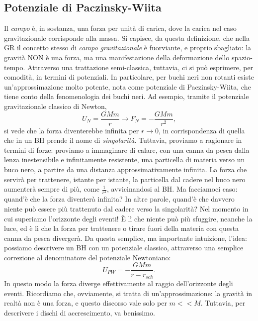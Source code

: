 \subsection{Potenziale di Paczinsky-Wiita}
Il \textit{campo} è, in sostanza, una forza per unità di carica, dove la carica nel caso gravitazionale corrisponde alla massa.
Si capisce, da questa definizione, che nella GR il concetto stesso di \textit{campo gravitazionale} è fuorviante, e proprio sbagliato: la gravità NON è una forza, ma una manifestazione della deformazione dello spazio-tempo.
Attraverso una trattazione semi-classica, tuttavia, ci si può esprimere, per comodità, in termini di potenziali.
In particolare, per buchi neri non rotanti esiste un'approssimazione molto potente, nota come potenziale di Paczinsky-Wiita, che tiene conto della fenomenologia dei buchi neri.
Ad esempio, tramite il potenziale gravitazionale classico di Newton,
\begin{equation}
    U_N = \frac{GMm}{r} \xrightarrow{} F_N=-\frac{GMm}{r^2}, 
\end{equation}
si vede che la forza diventerebbe infinita per $r\xrightarrow{}0$, in corrispondenza di quella che in un BH prende il nome di \textit{singolarità}.
Tuttavia, proviamo a ragionare in termini di forze:
proviamo a immaginare di calare, con una canna da pesca dalla lenza inestensibile e infinitamente resistente, una particella di materia verso un buco nero, a partire da una distanza approssimativamente infinita.
La forza che servirà per trattenere, istante per istante, la particella dal cadere nel buco nero aumenterà sempre di più, come $\frac{1}{r^2}$, avvicinandosi al BH. 
Ma facciamoci caso: quand'è che la forza diventerà infinita? In altre parole, quand'è che davvero niente può essere più trattenuto dal cadere verso la singolarità? 
Nel momento in cui superiamo l'orizzonte degli eventi! È lì che niente può più sfuggire, neanche la luce, ed è lì che la forza per trattenere o tirare fuori della materia con questa canna da pesca divergerà.
Da questa semplice, ma importante intuizione, l'idea: possiamo descrivere un BH con un potenziale classico, attraverso una semplice correzione al denominatore del potenziale Newtoniano:
\begin{equation}
    U_{PW} = -\frac{GMm}{r-r_{sch}}.
\end{equation}
In questo modo la forza diverge effettivamente al raggio dell'orizzonte degli eventi.
Ricordiamo che, ovviamente, si tratta di un'approssimazione: la gravità in realtà non è una forza, e questo discorso vale solo per $m<<M$.
Tuttavia, per descrivere i dischi di accrescimento, va benissimo.

